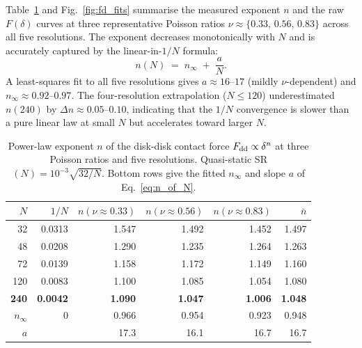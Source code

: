 \documentclass[aps,pre,twocolumn,floatfix,longbibliography]{revtex4-2}
\begin{document}
Table~\ref{tab:contact_exponent} and Fig.~\ref{fig:fd_fits} summarise the measured exponent $n$
and the raw $F(\delta)$ curves at three representative Poisson ratios
$\nu \approx \{0.33,\,0.56,\,0.83\}$ across all five resolutions.
The exponent decreases monotonically with $N$ and is accurately captured
by the linear-in-$1/N$ formula:
\begin{equation}
  n(N) \;=\; n_\infty \;+\; \frac{a}{N}.
  \label{eq:n_of_N}
\end{equation}
A least-squares fit to all five resolutions gives
$a \approx 16$--$17$ (mildly $\nu$-dependent) and
$n_\infty \approx 0.92$--$0.97$.
The four-resolution extrapolation ($N \leq 120$) underestimated $n(240)$ by
$\Delta n \approx 0.05$--$0.10$, indicating that the $1/N$ convergence is
slower than a pure linear law at small $N$ but accelerates toward larger $N$.

\begin{table}[htb]
\caption{Power-law exponent $n$ of the disk-disk contact force
  $F_{\rm dd} \propto \delta^n$ at three Poisson ratios and five resolutions.
  Quasi-static SR$(N) = 10^{-3}\sqrt{32/N}$.
  Bottom rows give the fitted $n_\infty$ and slope $a$ of Eq.~\eqref{eq:n_of_N}.}
\label{tab:contact_exponent}
\begin{ruledtabular}
\begin{tabular}{rrrrrr}
  $N$ & $1/N$ & $n(\nu\approx 0.33)$ & $n(\nu\approx 0.56)$ & $n(\nu\approx 0.83)$ & $\bar{n}$ \\
\hline
   32 & 0.0313 & 1.547 & 1.492 & 1.452 & 1.497 \\
   48 & 0.0208 & 1.290 & 1.235 & 1.264 & 1.263 \\
   72 & 0.0139 & 1.158 & 1.172 & 1.149 & 1.160 \\
  120 & 0.0083 & 1.100 & 1.085 & 1.054 & 1.080 \\
  \textbf{240} & \textbf{0.0042} & \textbf{1.090} & \textbf{1.047} & \textbf{1.006} & \textbf{1.048} \\
\hline
  $n_\infty$ & 0 & 0.966 & 0.954 & 0.923 & 0.948 \\
  $a$        &   & 17.3  & 16.1  & 16.7  & 16.7 \\
\end{tabular}
\end{ruledtabular}
\end{table}
\end{document}
